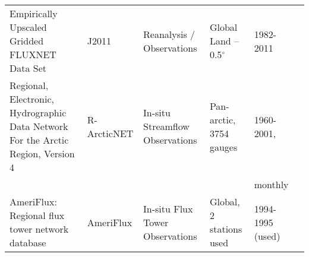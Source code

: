 \begin{table}[]
{\begin{tabular}{llllll}
Empirically Upscaled Gridded FLUXNET Data Set                                    & J2011          & Reanalysis / Observations       & Global Land – 0.5$^{\circ}$               & 1982-2011                  & \citet{Jung_2011}            \\
Regional, Electronic, Hydrographic Data Network For the Arctic Region, Version 4 & R-ArcticNET    & In-situ Streamflow Observations & Pan-arctic, 3754 gauges          & 1960-2001,                 & \citet{Lammers_2001}         \\
                                                                                 &                &                                 &                                  & monthly                    &                              \\
AmeriFlux: Regional flux tower network database                                  & AmeriFlux      & In-situ Flux Tower Observations & Global, 2 stations used          & 1994-1995 (used)           &                              \\ \hline
\end{tabular}
}
\end{table}

\begin{table}[]
\centering
\caption{Variables analyzed and datasets each variable is compared to.}
\label{table:s4}
\end{table}

